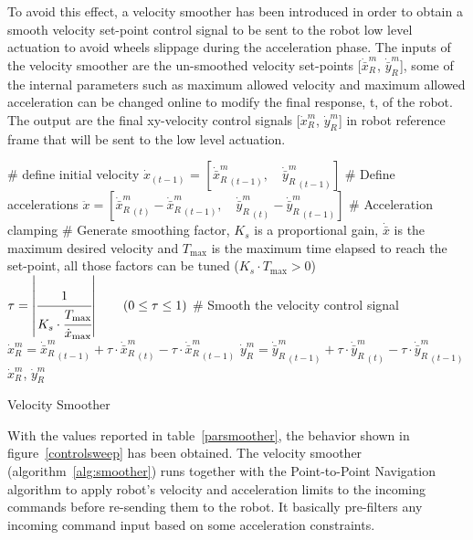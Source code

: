 To avoid this effect, a velocity smoother has been introduced in order to obtain a smooth velocity set-point control signal to be sent to the robot low level actuation to avoid wheels slippage during the  acceleration phase. The inputs of the velocity smoother are the un-smoothed velocity set-points [$\dot{\bar{x}}_R^m$, $\dot{\bar{y}}_R^m$], some of the internal parameters such as maximum allowed velocity and maximum allowed acceleration can be changed online to modify the final response, t, of the robot. The output are the final xy-velocity control signals [$\dot{x}_R^m$, $\dot{y}_R^m$] in robot reference frame that will be sent to the low level actuation.

\begin{algorithm}[h]
	\# define initial velocity\;
	$\dot{x}_{(t-1)}$ = $\left[{\dot{\bar{x}}_R^m}_{(t-1)},\quad {\dot{\bar{y}}_R^m}_{(t-1)}\right]$\;
	\# Define accelerations\;
	$\ddot{x}= \left[ {\dot{\bar{x}}_R^m}_{(t)}-{\dot{\bar{x}}_R^m}_{(t-1)},\quad {\dot{\bar{y}}_R^m}_{(t)}-{\dot{\bar{y}}_R^m}_{(t-1)}\right]$\;
	\# Acceleration clamping \;
	\# Generate smoothing factor, $K_s$ is a proportional gain, $\dot{\bar{x}}$ is the maximum desired velocity and $T_\text{max}$ is the maximum time elapsed to reach the set-point, all those factors can be tuned ($K_s\cdot T_\text{max} > 0 $)\;
	$\tau = \left| \cfrac{1}{K_s\cdot\cfrac{T_\text{max}}{\dot{x}_{\text{max}}}}\right|\qquad(0\leq\tau\leq1)$\;
	\# Smooth the velocity control signal\;
	${\dot{x}_R^m} = {\dot{\bar{x}}_R^m}_{(t-1)}+\tau\cdot{\dot{\bar{x}}_R^m}_{(t)}-\tau\cdot{\dot{\bar{x}}_R^m}_{(t-1)}$ \;
	${\dot{y}_R^m} = {\dot{\bar{y}}_R^m}_{(t-1)}+\tau\cdot{\dot{\bar{y}}_R^m}_{(t)}-\tau\cdot{\dot{\bar{y}}_R^m}_{(t-1)}$ \;
	\Return $\dot{x}_R^m$, $\dot{y}_R^m$
	\caption{Velocity Smoother} 
	\label{alg:smoother}
\end{algorithm}

With the values reported in table~\ref{parsmoother}, the behavior shown in figure~\ref{controlsweep} has been obtained. The velocity smoother (algorithm~\ref{alg:smoother}) runs together with the Point-to-Point Navigation algorithm to apply robot's velocity and acceleration limits to the incoming commands before re-sending them to the robot. It basically pre-filters any incoming command input based on some acceleration constraints. 

